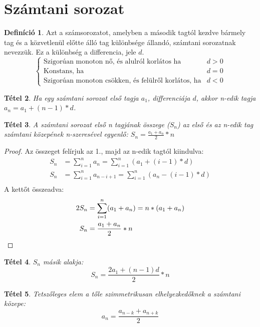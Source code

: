 \documentclass[twoside,12pt]{report}
\newtheorem{theorem}{Tétel}[section]
\theoremstyle{definition}
\newtheorem{definition}[theorem]{Definíció}
\begin{document}
\section{Számtani sorozat}
	\begin{definition}
		Azt a számsorozatot, amelyben a második tagtól kezdve bármely tag és a közvetlenül
		előtte álló tag különbsége állandó, számtani sorozatnak nevezzük. Ez a különbség a differencia, jele $d$.
		\begin{equation*}
		\begin{cases*}
			\text{Szigorúan monoton nő, és alulról korlátos ha} & d>0\\
			\text{Konstans, ha} & d=0\\
			\text{Szigorúan monoton csökken, és felülről korlátos, ha} & d<0
		\end{cases*}
		\end{equation*}
	\end{definition}
	\begin{theorem}
		Ha egy számtani sorozat első tagja $a_1$, differenciája $d$, akkor n-edik tagja $a_n=a_1+(n-1)*d$.
	\end{theorem}
	\begin{theorem}
		A számtani sorozat első n tagjának összege ($S_n$) az első és az n-edik tag számtani közepének n-szeresével egyenlő: $S_n=\frac{a_1+a_n}{2}*n$
	\end{theorem}
	\begin{proof}
		Az összeget felírjuk az 1., majd az n-edik tagtól kiindulva:
		\begin{align*}
			S_n&=\sum_{i=1}^{n} a_n=\sum_{i=1}^n (a_1+(i-1)*d)\\
			S_n&=\sum_{i=1}^n a_{n-i+1}=\sum_{i=1}^{n} (a_n-(i-1)*d)\\
		\end{align*}
		A kettőt összeadva:
		\begin{align*}
			2S_n&=\sum_{i=1}^{n} (a_1+a_n)=n*(a_1+a_n)\\
			S_n&=\frac{a_1+a_n}{2}*n\qedhere
		\end{align*}
	\end{proof}
	\begin{theorem}
		$S_n$ másik alakja:
		\begin{equation*}
			S_n=\frac{2a_1+(n-1)d}{2}*n
		\end{equation*}
	\end{theorem}
	\begin{theorem}
		Tetszőleges elem a tőle szimmetrikusan elhelyezkedőknek a számtani közepe:
		\begin{equation*}
			a_n=\frac{a_{n-k}+a_{n+k}}{2}
		\end{equation*}
	\end{theorem}
\end{document}
